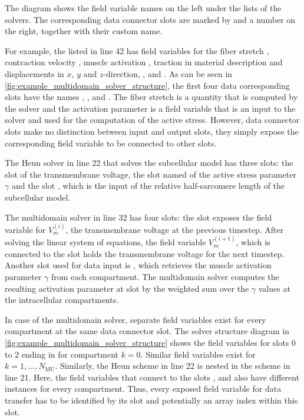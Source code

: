 The diagram shows the field variable names on the left under the  lists of the solvers. The corresponding data connector slots are marked by  and a number on the right, together with their custom name. 

For example, the  listed in line 42 has field variables for the fiber stretch \code{$\lambda$}, contraction velocity , muscle activation \code{$\gamma$}, traction in material description  and displacements in $x$, $y$ and $z$-direction, ,  and . As can be seen in \cref{fig:example_multidomain_solver_structure}, the first four data corresponding slots have the names , ,  and . The fiber stretch \code{$\lambda$} is a quantity that is computed by the solver and the activation parameter \code{$\gamma$} is a field variable that is an input to the solver and used for the computation of the active stress. However, data connector slots make no distinction between input and output slots, they simply expose the corresponding field variable to be connected to other slots.

The Heun solver in line 22 that solves the subcellular model has three slots: the slot  of the transmembrane voltage, the slot named  of the active stress parameter $\gamma$ and the slot , which is the input of the relative half-sarcomere length of the subcellular model.

The multidomain solver in line 32 has four slots: the slot  exposes the field variable for $V_m^{(i)}$, the transmembrane voltage at the previous timestep. After solving the linear system of equations, the field variable $V_m^{(i+1)}$, which is connected to the slot  holds the transmembrane voltage for the next timestep. Another slot used for data input is , which retrieves the muscle activation parameter $\gamma$ from each compartment. The multidomain solver computes the resulting activation parameter at slot  by the weighted sum over the $\gamma$ values at the intracellular compartments. 

In case of the multidomain solver, separate field variables exist for every compartment at the same data connector slot. The solver structure diagram in \cref{fig:example_multidomain_solver_structure} shows the field variables for slots 0 to 2 ending in  for compartment $k=0$. Similar field variables exist for $k=1,\dots,N_\text{MU}$. Similarly, the Heun scheme in line 22 is nested in the  scheme in line 21. Here, the field variables that connect to the slots ,  and  also have different instances for every compartment. Thus, every exposed field variable for data transfer has to be identified by its slot and potentially an array index within this slot.

